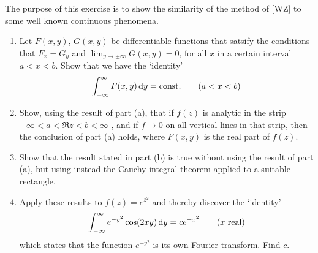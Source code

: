 \begin{exercise}
    The purpose of this exercise is to show the similarity of the method of [WZ] to some well known continuous phenomena.
    \begin{enumerate}[label=(\alph*)]
        \item Let $F(x,y)$, $G(x,y)$ be differentiable functions that satsify the conditions that $F_x=G_y$ and $\lim_{y\to\pm\infty}G(x,y)=0$, for all $x$ in a certain interval $a<x<b$. Show that we have the `identity'
        \[
            \int_{-\infty}^{\infty} F(x,y) \mathop{}\!\mathrm{d} y = \textnormal{const.} \qquad (a < x < b)
        \]
        \item Show, using the result of part (a), that if $f(z)$ is analytic in the strip $-\infty < a < \Re z < b < \infty$ , and if $f\to 0$ on all vertical lines in that strip, then the conclusion of part (a) holds, where $F(x,y)$ is the real part of $f(z)$.
        \item Show that the result stated in part (b) is true without using the result of part (a), but using instead the Cauchy integral theorem applied to a suitable rectangle.
        \item Apply these results to $f(z)=e^{z^2}$ and thereby discover the `identity'
        \[
            \int_{-\infty}^\infty e^{-y^2}\cos(2xy) \mathop{}\!\mathrm{d} y = ce^{-x^2} \qquad (x \textnormal{ real})
        \]
        which states that the function $e^{-y^2}$ is its own Fourier transform. Find $c$.
    \end{enumerate}
\end{exercise}
